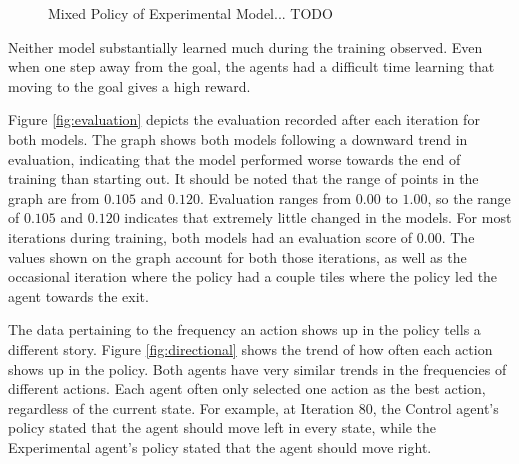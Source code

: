 \documentclass[12pt]{article}
\begin{document}
\begin{figure}[h]
	\begin{center}
		\begin{subfigure}{0.4\linewidth}
			
			\label{fig:policy_350}
		\end{subfigure}
		\hspace{0.1in}
		\begin{subfigure}{0.4\linewidth}
			
			\label{fig:policy_400}
		\end{subfigure}
	\end{center}
	\begin{center}
		\begin{subfigure}{0.4\linewidth}
			
			\label{fig:policy_450}
		\end{subfigure}
		\hspace{0.1in}
		\begin{subfigure}{0.4\linewidth}
			
			\label{fig:policy_500}
		\end{subfigure}
	\end{center}
	\caption{Mixed Policy of Experimental Model... TODO}
	\label{fig:policy}
\end{figure}


Neither model substantially learned much during the training observed.
Even when one step away from the goal, the agents had a difficult time learning that moving to the goal gives a high reward.

Figure \ref{fig:evaluation} depicts the evaluation recorded after each iteration for both models.
The graph shows both models following a downward trend in evaluation, indicating that the model performed worse towards the end of training than starting out.
It should be noted that the range of points in the graph are from $0.105$ and $0.120$.
Evaluation ranges from $0.00$ to $1.00$, so the range of $0.105$ and $0.120$ indicates that extremely little changed in the models.
For most iterations during training, both models had an evaluation score of $0.00$.
The values shown on the graph account for both those iterations, as well as the occasional iteration where the policy had a couple tiles where the policy led the agent towards the exit.

The data pertaining to the frequency an action shows up in the policy tells a different story.
Figure \ref{fig:directional} shows the trend of how often each action shows up in the policy.
Both agents have very similar trends in the frequencies of different actions.
Each agent often only selected one action as the best action, regardless of the current state.
For example, at Iteration 80, the Control agent's policy stated that the agent should move left in every state, while the Experimental agent's policy stated that the agent should move right.
\end{document}
